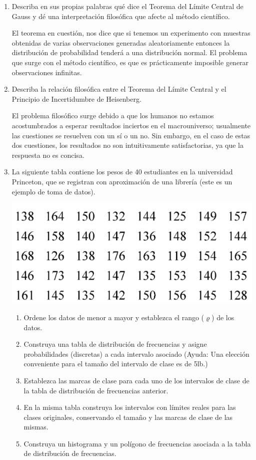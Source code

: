 \begin{enumerate}
	\item Describa en sus propias palabras qué dice el Teorema del Límite Central de Gauss y dé una interpretación filosófica que afecte al método científico.
	\begin{sol}
		El teorema en cuestión, nos dice que si tenemos un experimento con muestras obtenidas de varias observaciones generadas aleatoriamente entonces la distribución de probabilidad tenderá a una distribución normal. El problema que surge con el método científico, es que es prácticamente imposible generar observaciones infinitas. 
	\end{sol}
	
	\item Describa la relación filosófica entre el Teorema del Límite Central y el Principio de Incertidumbre de Heisenberg. 
	\begin{sol}
		El problema filosófico surge debido a que los humanos no estamos acostumbrados a esperar resultados inciertos en el macrouniverso; usualmente las cuestiones se resuelven con un sí o un no. Sin embargo, en el caso de estas dos cuestiones, los resultados no son intuitivamente satisfactorias, ya que la respuesta no es concisa. 
	\end{sol}
	\item La siguiente tabla contiene los pesos de 40 estudiantes en la universidad Princeton, que se registran con aproximación de una librería (este es un ejemplo de toma de datos).
	\begin{center}
		\includegraphics[scale=0.4]{images/1}
	\end{center}

	\begin{enumerate}
		\item Ordene los datos de menor a mayor y establezca el rango ($\varrho$) de los datos.
		\item Construya una tabla de distribución de frecuencias y asigne probabilidades (discretas) a cada intervalo asociado (Ayuda: Una elección conveniente para el tamaño del intervalo de clase es de 5lb.)
		\item Establezca las marcas de clase para cada uno de los intervalos de clase de la tabla de distribución de frecuencias anterior.
		\item En la misma tabla construya los intervalos con límites reales para las clases originales, conservando el tamaño y las marcas de clase de las mismas.
		\item Construya un histograma y un polígono de frecuencias asociada a la tabla de distribución de frecuencias.
	\end{enumerate}
\end{enumerate}





%
%

